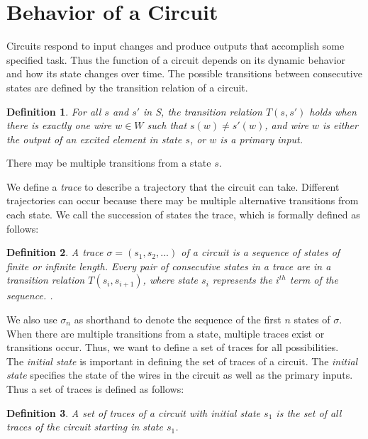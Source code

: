 \documentclass[12pt]{report}
\newtheorem*{definition}{Definition}
\begin{document}
\section{Behavior of a Circuit}    
Circuits respond to input changes and produce outputs that accomplish some specified task.  Thus the function of a circuit depends on its dynamic behavior and how its state changes over time.  The possible transitions between consecutive states are defined by the transition relation of a circuit.
\begin{definition}
For all $s$ and $s'$ in S, the \emph{transition relation} $T(s,s')$ holds when there is exactly one wire $w \in W$ such that $s(w)\neq s'(w)$, and wire $w$ is either the output of an excited element in state $s$, or $w$ is a primary input.
\end{definition}
There may be multiple transitions from a state $s$.


We define a {\em trace} to describe a trajectory that the circuit can take.  Different trajectories can occur because there may be multiple alternative transitions from each state.  We call the succession of states the trace, which is formally defined as follows:
\begin{definition}A {\em trace} $\sigma=(s_1, s_2, ...)$ of a circuit is a sequence of states of finite or infinite length.  
 Every pair of consecutive states in a trace are in a transition relation $T(s_i,s_{i+1})$, where state $s_i$ represents the $i^{th}$ term of the sequence.  .  %
\end{definition} 
We also use $\sigma_n$ as shorthand to denote the sequence of the first $n$ states of $\sigma$.
When there are multiple transitions from a state, multiple traces exist or transitions occur.  Thus, we want to define a set of traces for all possibilities.\\

The {\em initial state} is important in defining the set of traces of a circuit.  The {\em initial state} specifies the state of the wires in the circuit as well as the primary inputs.  Thus a set of traces is defined as follows:
\begin{definition}
A {\em set of traces} of a circuit with initial state $s_1$ is the set of all traces of the circuit starting in state $s_1$. 
\end{definition} 
\end{document}
